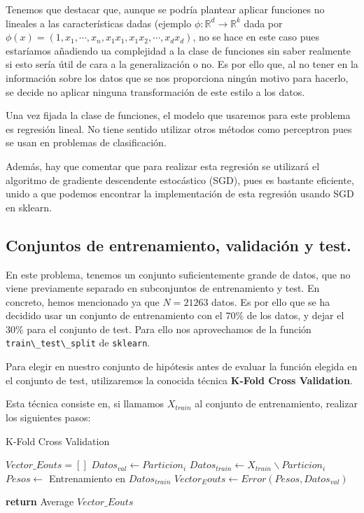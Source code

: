 \documentclass[a4paper, 20pt]{article}
\newcommand{\R}{\mathbb R}
\begin{document}
Tenemos que destacar que, aunque se podría plantear aplicar funciones no lineales a las características dadas (ejemplo $\phi :\R^d \to \R^{k}$ dada por $\phi(x) = (1,x_1,\cdots,x_n,x_1x_1,x_1x_2,\cdots,x_dx_d)$, no se hace en este caso pues estaríamos añadiendo ua complejidad a la clase de funciones sin saber realmente si esto sería útil de cara a la generalización o no. Es por ello que, al no tener en la información sobre los datos que se nos proporciona ningún motivo para hacerlo, se decide no aplicar ninguna transformación de este estilo a los datos.

Una vez fijada la clase de funciones, el modelo que usaremos para este problema es regresión lineal. No tiene sentido utilizar otros métodos como perceptron pues se usan en problemas de clasificación. 

Además, hay que comentar que para realizar esta regresión se utilizará el algoritmo de gradiente descendente estocástico (SGD), pues es bastante eficiente, unido a que podemos encontrar la implementación de esta regresión usando SGD en sklearn.

\subsection{Conjuntos de entrenamiento, validación y test.}

En este problema, tenemos un conjunto suficientemente grande de datos, que no viene previamente separado en subconjuntos de entrenamiento y test. En concreto, hemos mencionado ya que $N = 21263$ datos. Es por ello que se ha decidido usar un conjunto de entrenamiento con el $70\%$ de los datos, y dejar el $30\%$ para el conjunto de test. Para ello nos aprovechamos de la función \lstinline{train\_test\_split} de \lstinline{sklearn}.

Para elegir en nuestro conjunto de hipótesis antes de evaluar la función elegida en el conjunto de test, utilizaremos la conocida técnica \textbf{K-Fold Cross Validation}.

Esta técnica consiste en, si llamamos $X_{train}$ al conjunto de entrenamiento, realizar los siguientes pasos:
\begin{algorithm}[H]
  \caption{K-Fold Cross Validation}
  \begin{algorithmic}[1]
  \State $Vector\_Eouts = []$
    \State $ Datos_{val} \gets Particion_i$
    \State $ Datos_{train} \gets X_{train} \backslash Particion _i$
    \State $ Pesos \gets $ Entrenamiento en $Datos_{train}$
    \State $ Vector_Eouts \gets Error(Pesos, Datos_{val})$

  \EndFor

  \State \textbf{return} Average $Vector\_Eouts$
  
  \end{algorithmic}
\end{algorithm}
\end{document}
